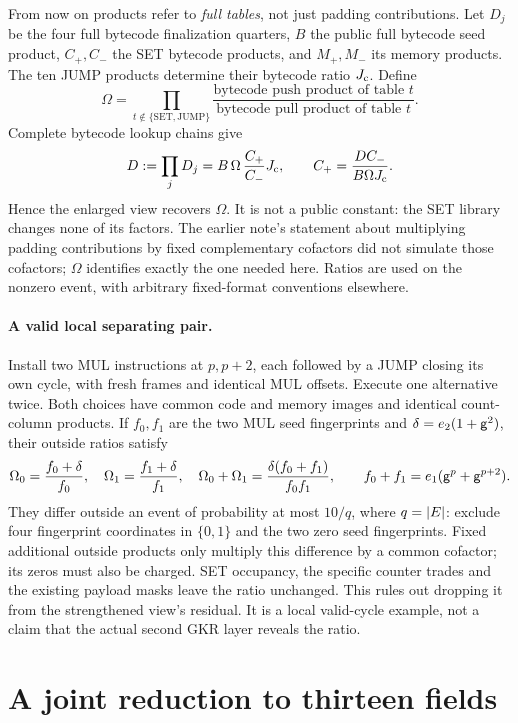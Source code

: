 \documentclass[11pt]{article}
\begin{document}
From now on products refer to \emph{full tables}, not just padding contributions. Let $D_j$ be the four full bytecode finalization quarters, $B$ the public full bytecode seed product, $C_+,C_-$ the SET bytecode products, and $M_+,M_-$ its memory products. The ten JUMP products determine their bytecode ratio $J_{\rm c}$. Define
\[
 \Omega=\prod_{t\notin\{\mathrm{SET},\mathrm{JUMP}\}}
 \frac{\text{bytecode push product of table }t}
      {\text{bytecode pull product of table }t}.
\]
Complete bytecode lookup chains give
\[
 D:=\prod_jD_j=B\,\Omega\,\frac{C_+}{C_-}J_{\rm c},
 \qquad
 C_+=\frac{D C_-}{B\Omega J_{\rm c}}.
\]
Hence the enlarged view recovers $\Omega$. It is not a public constant: the SET library changes none of its factors. The earlier note's statement about multiplying padding contributions by fixed complementary cofactors did not simulate those cofactors; $\Omega$ identifies exactly the one needed here. Ratios are used on the nonzero event, with arbitrary fixed-format conventions elsewhere.

\paragraph{A valid local separating pair.} Install two MUL instructions at $p,p+2$, each followed by a JUMP closing its own cycle, with fresh frames and identical MUL offsets. Execute one alternative twice. Both choices have common code and memory images and identical count-column products. If $f_0,f_1$ are the two MUL seed fingerprints and $\delta=e_2(1+\mathsf{g}^2)$, their outside ratios satisfy
\[
 \Omega_0=\frac{f_0+\delta}{f_0},\quad
 \Omega_1=\frac{f_1+\delta}{f_1},\quad
 \Omega_0+\Omega_1=\frac{\delta(f_0+f_1)}{f_0f_1},
 \qquad f_0+f_1=e_1(\mathsf{g}^p+\mathsf{g}^{p+2}).
\]
They differ outside an event of probability at most $10/q$, where $q=|E|$: exclude four fingerprint coordinates in $\{0,1\}$ and the two zero seed fingerprints. Fixed additional outside products only multiply this difference by a common cofactor; its zeros must also be charged. SET occupancy, the specific counter trades and the existing payload masks leave the ratio unchanged. This rules out dropping it from the strengthened view's residual. It is a local valid-cycle example, not a claim that the actual second GKR layer reveals the ratio.

\section{A joint reduction to thirteen fields}
\end{document}
